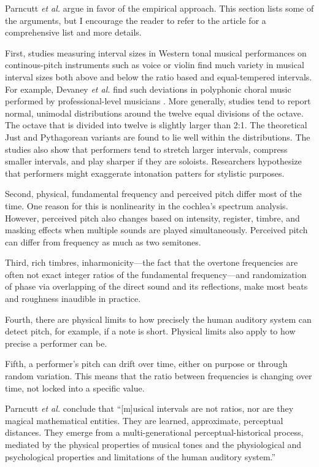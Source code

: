 Parncutt \textit{et al.} argue in favor of the empirical approach. This section lists some of the arguments, but I encourage the reader to refer to the article for a comprehensive list and more details. 

First, studies measuring interval sizes in Western tonal musical performances on continous-pitch instruments such as voice or violin find much variety in musical interval sizes both above and below the ratio based and equal-tempered intervals. For example, Devaney \textit{et al.} find such deviations in polyphonic choral music performed by professional-level musicians \cite{devaney2011intonation}. More generally, studies tend to report normal, unimodal distributions around the twelve equal divisions of the octave. The octave that is divided into twelve is slightly larger than 2:1. The theoretical Just and Pythagorean variants are found to lie well within the distributions. The studies also show that performers tend to stretch larger intervals, compress smaller intervals, and play sharper if they are soloists. Researchers hypothesize that performers might exaggerate intonation patters for stylistic purposes. 

Second, physical, fundamental frequency and perceived pitch differ most of the time. One reason for this is nonlinearity in the cochlea’s spectrum analysis. However, perceived pitch also changes based on intensity, register, timbre, and masking effects when multiple sounds are played simultaneously. Perceived pitch can differ from frequency as much as two semitones.

Third, rich timbres, inharmonicity---the fact that the overtone frequencies are often not exact integer ratios of the fundamental frequency---and randomization of phase via overlapping of the direct sound and its reflections, make most beats and roughness inaudible in practice.

Fourth, there are physical limits to how precisely the human auditory system can detect pitch, for example, if a note is short. Physical limits also apply to how precise a performer can be.

Fifth, a performer's pitch can drift over time, either on purpose or through random variation. This means that the ratio between frequencies is changing over time, not locked into a specific value.

Parncutt \textit{et al.} conclude that ``[m]usical intervals are not ratios, nor are they magical mathematical entities. They are learned, approximate, perceptual distances. They emerge from a multi-generational perceptual-historical process, mediated by the physical properties of musical tones and the physiological and psychological properties and limitations of the human auditory system.''
 
